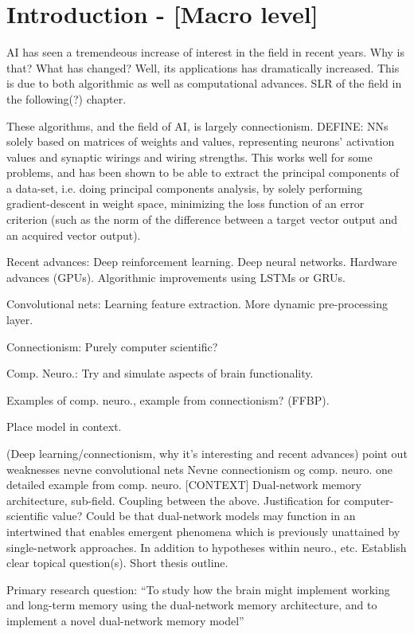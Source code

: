 
\chapter{Introduction - [Macro level]}\label{chpt:intro}


AI has seen a tremendeous increase of interest in the field in recent years. Why is that? What has changed? Well, its applications has dramatically increased. This is due to both algorithmic as well as computational advances. SLR of the field in the following(?) chapter.

These algorithms, and the field of AI, is largely connectionism. DEFINE: NNs solely based on matrices of weights and values, representing neurons' activation values and synaptic wirings and wiring strengths. This works well for some problems, and has been shown to be able to extract the principal components of a data-set, i.e. doing principal components analysis, by solely performing gradient-descent in weight space, minimizing the loss function of an error criterion (such as the norm of the difference between a target vector output and an acquired vector output).

Recent advances: Deep reinforcement learning. Deep neural networks. Hardware advances (GPUs). Algorithmic improvements using LSTMs or GRUs.

Convolutional nets: Learning feature extraction. More dynamic pre-processing layer.

Connectionism: Purely computer scientific?

Comp. Neuro.: Try and simulate aspects of brain functionality.

Examples of comp. neuro., example from connectionism? (FFBP).

Place model in context.



(Deep learning/connectionism, why it’s interesting and recent advances)
point out weaknesses
nevne convolutional nets
Nevne connectionism og comp. neuro.
one detailed example from comp. neuro. [CONTEXT]
Dual-network memory architecture, sub-field.
Coupling between the above. Justification for computer-scientific value? 
Could be that dual-network models may function in an intertwined that enables emergent phenomena which is previously unattained by single-network approaches. In addition to hypotheses within neuro., etc.
Establish clear topical question(s).
Short thesis outline.


Primary research question: “To study how the brain might implement working and long-term memory using the dual-network memory architecture, and to implement a novel dual-network memory model”


\cleardoublepage